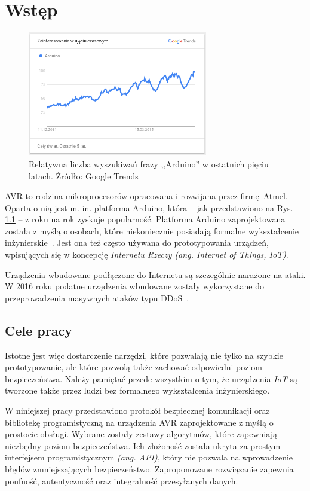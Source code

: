 \chapter{Wstęp}
\label{cha:wstep}

\begin{figure}[h]
\centering
\includegraphics[width=0.7\textwidth]{images/arduino-trends.png}
\caption{Relatywna liczba wyszukiwań frazy ,,Arduino'' w ostatnich pięciu latach. Źródło: Google Trends}
\label{fig:arduinotrends}
\end{figure}

AVR to rodzina mikroprocesorów opracowana i rozwijana przez firmę Atmel. Oparta o nią jest m. in. platforma Arduino, która -- jak przedstawiono na Rys. \ref{fig:arduinotrends} -- z roku na rok zyskuje popularność. Platforma Arduino zaprojektowana została z myślą o osobach, które niekoniecznie posiadają formalne wykształcenie inżynierskie~\cite{BanShi14}. Jest ona też często używana do prototypowania urządzeń, wpisujących się w koncepcję \emph{Internetu Rzeczy (ang. Internet of Things, IoT)}.

Urządzenia wbudowane podłączone do Internetu są szczególnie narażone na ataki. W 2016 roku podatne urządzenia wbudowane zostały wykorzystane do przeprowadzenia masywnych ataków typu DDoS~\cite{AkaIOT}.

\section{Cele pracy}

Istotne jest więc dostarczenie narzędzi, które pozwalają nie tylko na szybkie prototypowanie, ale które pozwolą także zachować odpowiedni poziom bezpieczeństwa. Należy pamiętać przede wszystkim o tym, że urządzenia \emph{IoT} są tworzone także przez ludzi bez formalnego wykształcenia inżynierskiego.

W niniejszej pracy przedstawiono protokół bezpiecznej komunikacji oraz bibliotekę programistyczną na urządzenia AVR zaprojektowane z myślą o prostocie obsługi. Wybrane zostały zestawy algorytmów, które zapewniają niezbędny poziom bezpieczeństwa. Ich złożoność została ukryta za prostym interfejsem programistycznym \emph{(ang. API)}, który nie pozwala na wprowadzenie błędów zmniejszających bezpieczeństwo.  Zaproponowane rozwiązanie zapewnia poufność, autentyczność oraz integralność przesyłanych danych.


